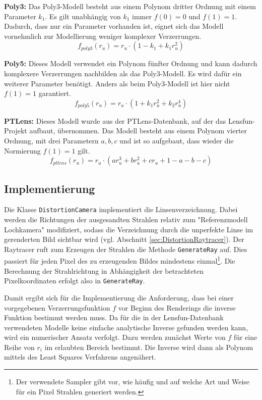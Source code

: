 \textbf{Poly3:} Das Poly3-Modell besteht aus einem Polynom dritter Ordnung mit einem Parameter $k_1$. Es gilt unabhängig von $k_1$ immer $f(0) = 0$ und $f(1) = 1$. Dadurch, dass nur ein Parameter vorhanden ist, eignet sich das Modell vornehmlich zur Modellierung weniger komplexer Verzerrungen.
\begin{equation}
	f_{poly3}(r_u) = r_u \cdot (1 - k_1 + k_1 r_u^2)
\end{equation}

\textbf{Poly5:} Dieses Modell verwendet ein Polynom fünfter Ordnung und kann dadurch komplexere Verzerrungen nachbilden als das Poly3-Modell. Es wird dafür ein weiterer Parameter benötigt. Anders als beim Poly3-Modell ist hier nicht $f(1) = 1$ garantiert.
\begin{equation}
	f_{poly5}(r_u) = r_u \cdot (1 + k_1 r_u^2 + k_2 r_u^4)
\end{equation}

\textbf{PTLens:} Dieses Modell wurde aus der PTLens-Datenbank, auf der das Lensfun-Projekt aufbaut, übernommen. Das Modell besteht aus einem Polynom vierter Ordnung, mit drei Parametern $a,b,c$ und ist so aufgebaut, dass wieder die Normierung $f(1) = 1$ gilt.
\begin{equation}
	f_{ptlens}(r_u) = r_u \cdot (a r_u^3 + b r_u^2 + c r_u + 1 - a - b - c)
\end{equation}

\subsection{Implementierung}\label{subsec:implementation}

Die Klasse \texttt{DistortionCamera} implementiert die Linsenverzeichnung. Dabei werden die Richtungen der ausgesandten Strahlen relativ zum "Referenzmodell Lochkamera" modifiziert, sodass die Verzeichnung durch die unperfekte Linse im gerenderten Bild sichtbar wird (vgl. Abschnitt \ref{sec:DistortionRaytracer}). Der Raytracer ruft zum Erzeugen der Strahlen die Methode \texttt{GenerateRay} auf. Dies passiert für jeden Pixel des zu erzeugenden Bildes mindestens einmal\footnote{Der verwendete Sampler gibt vor, wie häufig und auf welche Art und Weise für ein Pixel Strahlen generiert werden.}. Die Berechnung der Strahlrichtung in Abhängigkeit der betrachteten Pixelkoordinaten erfolgt also in \texttt{GenerateRay}.

Damit ergibt sich für die Implementierung die Anforderung, dass bei einer vorgegebenen Verzerrungsfunktion $f$ vor Beginn des Renderings die inverse Funktion bestimmt werden muss. Da für die in der Lensfun-Datenbank verwendeten Modelle keine einfache analytische Inverse gefunden werden kann, wird ein numerischer Ansatz verfolgt. Dazu werden zunächst Werte von $f$ für eine Reihe von $r_i$ im erlaubten Bereich bestimmt. Die Inverse wird dann als Polynom mittels des Least Squares Verfahrens angenähert.


